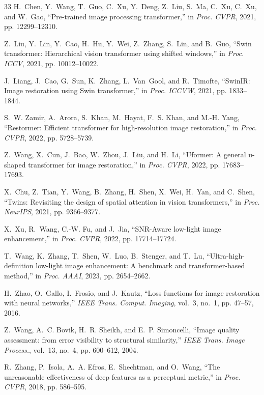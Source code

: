 \documentclass[conference]{IEEEtran}
\begin{document}
\begin{thebibliography}{33}
H.~Chen, Y.~Wang, T.~Guo, C.~Xu, Y.~Deng, Z.~Liu, S.~Ma, C.~Xu, C.~Xu, and W.~Gao, ``Pre-trained image processing transformer,'' in \emph{Proc. CVPR}, 2021, pp. 12299--12310.

Z.~Liu, Y.~Lin, Y.~Cao, H.~Hu, Y.~Wei, Z.~Zhang, S.~Lin, and B.~Guo, ``Swin transformer: Hierarchical vision transformer using shifted windows,'' in \emph{Proc. ICCV}, 2021, pp. 10012--10022.

J.~Liang, J.~Cao, G.~Sun, K.~Zhang, L.~Van~Gool, and R.~Timofte, ``SwinIR: Image restoration using Swin transformer,'' in \emph{Proc. ICCVW}, 2021, pp. 1833--1844.

S.~W. Zamir, A.~Arora, S.~Khan, M.~Hayat, F.~S. Khan, and M.-H. Yang, ``Restormer: Efficient transformer for high-resolution image restoration,'' in \emph{Proc. CVPR}, 2022, pp. 5728--5739.

Z.~Wang, X.~Cun, J.~Bao, W.~Zhou, J.~Liu, and H.~Li, ``Uformer: A general u-shaped transformer for image restoration,'' in \emph{Proc. CVPR}, 2022, pp. 17683--17693.

X.~Chu, Z.~Tian, Y.~Wang, B.~Zhang, H.~Shen, X.~Wei, H.~Yan, and C.~Shen, ``Twins: Revisiting the design of spatial attention in vision transformers,'' in \emph{Proc. NeurIPS}, 2021, pp. 9366--9377.

X.~Xu, R.~Wang, C.-W. Fu, and J.~Jia, ``SNR-Aware low-light image enhancement,'' in \emph{Proc. CVPR}, 2022, pp. 17714--17724.

T.~Wang, K.~Zhang, T.~Shen, W.~Luo, B.~Stenger, and T.~Lu, ``Ultra-high-definition low-light image enhancement: A benchmark and transformer-based method,'' in \emph{Proc. AAAI}, 2023, pp. 2654--2662.

H.~Zhao, O.~Gallo, I.~Frosio, and J.~Kautz, ``Loss functions for image restoration with neural networks,'' \emph{IEEE Trans. Comput. Imaging}, vol.~3, no.~1, pp. 47--57, 2016.

Z.~Wang, A.~C. Bovik, H.~R. Sheikh, and E.~P. Simoncelli, ``Image quality assessment: from error visibility to structural similarity,'' \emph{IEEE Trans. Image Process.}, vol.~13, no.~4, pp. 600--612, 2004.

R.~Zhang, P.~Isola, A.~A. Efros, E.~Shechtman, and O.~Wang, ``The unreasonable effectiveness of deep features as a perceptual metric,'' in \emph{Proc. CVPR}, 2018, pp. 586--595.

\end{thebibliography}
\end{document}
